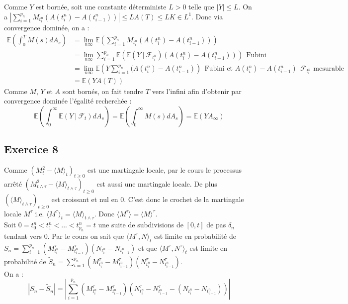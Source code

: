 \documentclass[a4paper,12pt]{article}
\newcommand{\E}{\mathbb{E}}
\newcommand{\f}{\mathcal{F}}
\begin{document}
Comme $Y$ est bornée, soit une constante déterministe $L>0$ telle que $|Y| \leq L$. On a $|\sum_{i=1}^{p_n} M_{t_{i}^n} (A(t_i^n)-A(t_{i-1}^n))| \leq L A(T) \leq LK \in L^1$. Donc via convergence dominée, on a :
\begin{align*}
\E \left( \int_0^T M(s) dA_s \right) & = \lim_{n\infty} \E \left( \sum_{i=1}^{p_n} M_{t_{i}^n} (A(t_i^n)-A(t_{i-1}^n)) \right) \\
& = \lim_{n\infty} \sum_{i=1}^{p_n} \E \left( \E ( Y \ | \ \f_{t_{i}^n})(A(t_i^n)-A(t_{i-1}^n)) \right) \ \ \text{Fubini} \\
& = \lim_{n \infty} \E \left( Y \sum_{i=1}^{p_n} (A(t_i^n)-A(t_{i-1}^n) \right) \ \ \text{Fubini et }A(t_i^n)-A(t_{i-1}^n) \ \ \f_{t_i^n} \text{ mesurable} \\
& = \E (Y A(T))
\end{align*}
Comme $M$, $Y$ et $A$ sont bornés, on fait tendre $T$ vers l'infini afin d'obtenir par convergence dominée l'égalité recherchée :
$$\E \left( \int_0^{\infty} \E (Y \ | \ \f_t) dA_s \right) = \E \left( \int_0^{\infty} M(s) dA_s \right) = \E(Y A_{\infty})$$

\subsection{Exercice 8}
Comme $(M_t^2 - \langle M \rangle_t)_{t \geq 0}$ est une martingale locale, par le cours le processus arrêté $(M_{t \wedge \tau}^2 - \langle M \rangle_{t \wedge \tau})_{t \geq 0}$ est aussi une martingale locale. De plus $(\langle M \rangle_{t \wedge \tau})_{t \geq 0}$ est croissant et nul en $0$. C'est donc le crochet de la martingale locale $M^{\tau}$ i.e. $\langle M^{\tau} \rangle_t= \langle M \rangle_{t \wedge \tau}$. Donc $\langle M^{\tau} \rangle = \langle M \rangle^{\tau}$. \\

Soit $0=t_0^n<t_1^n<...<t_{p_n}^n=t$ une suite de subdivisions de $[0,t]$ de pas $\delta_n$ tendant vers $0$. Par le cours on sait que  $\langle M^{\tau}, N \rangle_t$ est limite en probabilité de $S_n = \sum_{i=1}^{p_n} (M^\tau_{t_i^n} - M^\tau_{t_{i-1}^n})(N_{t_i^n} - N_{t_{i-1}^n})$ et que $\langle M^{\tau}, N^{\tau} \rangle_t$ est limite en probabilité de $\tilde{S}_n = \sum_{i=1}^{p_n} (M^\tau_{t_i^n} - M^\tau_{t_{i-1}^n})(N^\tau_{t_i^n} - N^\tau_{t_{i-1}^n})$. \\

On a :
$$|S_n - \tilde{S}_n| = \left| \sum_{i=1}^{p_n} (M^\tau_{t_i^n} - M^\tau_{t_{i-1}^n}) (N^\tau_{t_i^n} - N^\tau_{t_{i-1}^n} - (N_{t_i^n} - N_{t_{i-1}^n})) \right| $$
\end{document}

